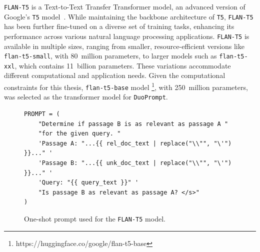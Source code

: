 \texttt{FLAN-T5} is a Text-to-Text Transfer Transformer model, an advanced version of Google's \texttt{T5} model~\citep{raffel:2020}. While maintaining the backbone architecture of \texttt{T5}, \texttt{FLAN-T5} has been further fine-tuned on a diverse set of training tasks, enhancing its performance across various natural language processing applications. \texttt{FLAN-T5} is available in multiple sizes, ranging from smaller, resource-efficient versions like \texttt{flan-t5-small}, with 80~million parameters, to larger models such as \texttt{flan-t5-xxl}, which contains 11~billion parameters. These variations accommodate different computational and application needs. Given the computational constraints for this thesis, \texttt{flan-t5-base} model \footnote{https://huggingface.co/google/flan-t5-base}, with 250~million parameters, was selected as the transformer model for \texttt{DuoPrompt}.

\begin{figure}[t]
    \centering
    \begin{tcolorbox}[title=One-Shot Prompt, width=\textwidth]
        \footnotesize
        \begin{verbatim}
PROMPT = (
    "Determine if passage B is as relevant as passage A "
    "for the given query. "
    'Passage A: "...{{ rel_doc_text | replace("\\"", "\'") }}..." '
    'Passage B: "...{{ unk_doc_text | replace("\\"", "\'") }}..." '
    'Query: "{{ query_text }}" '
    "Is passage B as relevant as passage A? </s>"
)
        \end{verbatim}
    \end{tcolorbox}
    \caption{One-shot prompt used for the \texttt{FLAN-T5} model.}
    \label{fig:oneshot-prompt}
\end{figure}

